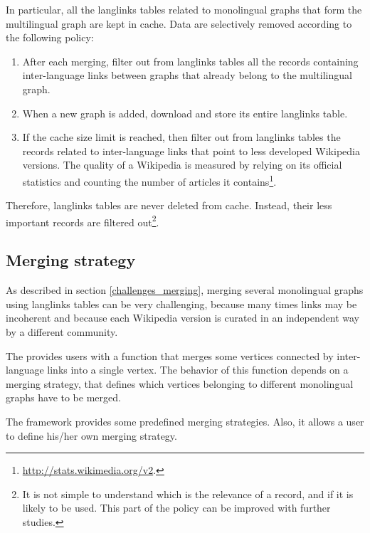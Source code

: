                 In particular, all the langlinks tables related to monolingual graphs that form the multilingual graph are kept in cache. Data are selectively removed according to the following policy:
                \begin{enumerate}
                    \item After each merging, filter out from langlinks tables all the records containing inter-language links between graphs that already belong to the multilingual graph.
                    \item When a new graph is added, download and store its entire langlinks table.
                    \item If the cache size limit is reached, then filter out from langlinks tables the records related to inter-language links that point to less developed Wikipedia versions. The quality of a Wikipedia is measured by relying on its official statistics and counting the number of articles it contains\footnote{\url{http://stats.wikimedia.org/v2}.}.
                \end{enumerate}
                Therefore, langlinks tables are never deleted from cache. Instead, their less important records are filtered out\footnote{It is not simple to understand which is the relevance of a record, and if it is likely to be used. This part of the policy can be improved with further studies.}.
        \subsection{Merging strategy}\label{merging_strategy}
            As described in section \ref{challenges_merging}, merging several monolingual graphs using langlinks tables can be very challenging, because many times links may be incoherent and because each Wikipedia version is curated in an independent way by a different community.
            
            The  provides users with a  function that merges some vertices connected by inter-language links into a single vertex. The behavior of this function depends on a merging strategy, that defines which vertices belonging to different monolingual graphs have to be merged.
            
            The framework provides some predefined merging strategies. Also, it allows a user to define his/her own merging strategy.
